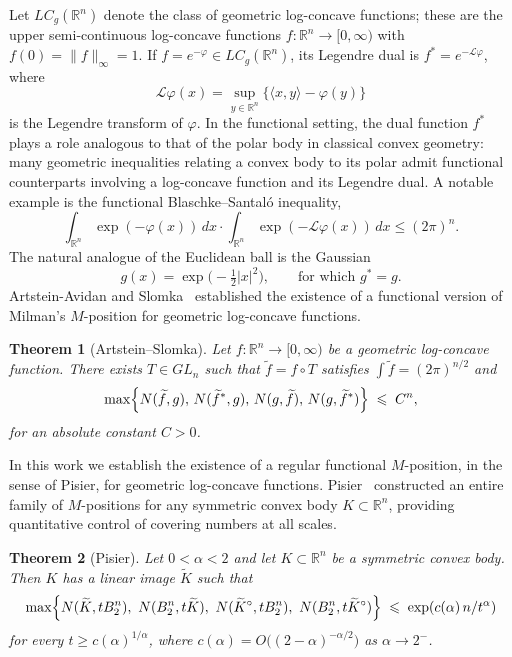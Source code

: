 \documentclass[11pt,leqno]{article}
\newtheorem{theorem}{Theorem}[section]
\theoremstyle{definition}
\theoremstyle{remark}
\numberwithin{equation}{section}
\newcommand{\ls}{\leqslant}
\newcommand{\gr}{\geqslant}
\begin{document}
Let $LC_{g}(\mathbb{R}^{n})$ denote the class of geometric log-concave functions; these are the upper 
semi-continuous log-concave functions $f:\mathbb{R}^{n}\to[0,\infty)$ with $f(0)=\|f\|_{\infty}=1$. If 
$f=e^{-\varphi}\in LC_{g}(\mathbb{R}^{n})$, its Legendre dual is $f^{\ast}=e^{-\mathcal L\varphi}$, where
$$\mathcal{L}\varphi(x)= \sup_{y\in\mathbb{R}^{n}}\bigl\{\langle x,y\rangle - \varphi(y)\bigr\}$$
is the Legendre transform of $\varphi$. In the functional setting, the dual function $f^{\ast}$ plays a role analogous to that 
of the polar body in classical convex geometry: many geometric inequalities relating 
a convex body to its polar admit functional counterparts involving a log-concave 
function and its Legendre dual. A notable example is the functional Blaschke--Santal\'o inequality,
\begin{equation*} \int_{\mathbb{R}^n} \exp (-\varphi(x))\,dx\cdot \int_{\mathbb{R}^n} \exp (-\mathcal{L}\varphi(x))\,dx 
\ls (2\pi)^n.\end{equation*}
The natural analogue of the Euclidean ball is the Gaussian
$$g(x)=\exp\bigl(-\tfrac{1}{2}|x|^{2}\bigr),\qquad\text{for which } g^{\ast}=g.$$
Artstein-Avidan and Slomka~\cite{Artstein-Slomka-2021} established the existence of a
functional version of Milman's $M$-position for geometric log-concave
functions.

\begin{theorem}[Artstein--Slomka] \label{th:M-covering}
Let $f:\mathbb{R}^{n}\to[0,\infty)$ be a geometric log-concave function.
There exists $T\in GL_{n}$ such that $\widetilde f=f\circ T$ satisfies
$\int \widetilde f = (2\pi)^{n/2}$ and
$$\max\Bigl\{N(\widetilde f,g),\, N(\widetilde f^{\ast},g),\, N(g,\widetilde f),\, N(g,\widetilde f^{\ast})
\Bigr\} \;\ls\; C^{n},$$
for an absolute constant $C>0$.
\end{theorem}

In this work we establish the existence of a regular functional $M$-position, in the sense of Pisier, for geometric log-concave 
functions. Pisier~\cite{Pisier-1989} constructed an entire family of $M$-positions for any symmetric convex body $K\subset\mathbb{R}^{n}$, 
providing quantitative control of covering numbers at all scales.

\begin{theorem}[Pisier] \label{th:pisier-alpha-regular}
Let $0<\alpha<2$ and let $K\subset\mathbb{R}^{n}$ be a symmetric convex body. Then $K$ has a linear image $\widetilde K$ such that
$$\max\Bigl\{ N(\widetilde K, t B_{2}^{n}),\ N(B_{2}^{n}, t\widetilde K),\ N(\widetilde K^{\circ}, t B_{2}^{n}),\
N(B_{2}^{n}, t\widetilde K^{\circ})\Bigr\}\;\ls\;\exp\!\left(c(\alpha)\, n/t^{\alpha}\right)$$
for every $t\gr c(\alpha)^{1/\alpha}$, where $c(\alpha)=O\!\bigl((2-\alpha)^{-\alpha/2}\bigr)$ as $\alpha\to 2^{-}$.
\end{theorem}
\end{document}
